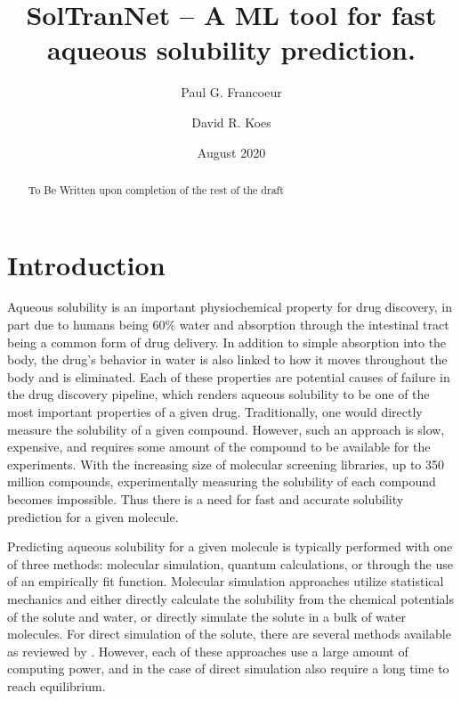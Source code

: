 \documentclass[journal=jmcmar,manuscript=article]{achemso}
\title{SolTranNet -- A ML tool for fast aqueous solubility prediction.}
\author{Paul G. Francoeur}
\author{David R. Koes}
\affiliation[Pitt]{Department of Computational and Systems Biology, University of Pittsburgh, Pittsburgh, PA 15260}
\date{August 2020}
\begin{document}
\begin{abstract}
To Be Written upon completion of the rest of the draft

\end{abstract}


\section{Introduction}
Aqueous solubility is an important physiochemical property for drug discovery, in part due to humans being 60\% water\cite{HumanWater} and absorption through the intestinal tract being a common form of drug delivery. 
In addition to simple absorption into the body, the drug's behavior in water is also linked to how it moves throughout the body and is eliminated. Each of these properties are potential causes of failure in the drug discovery pipeline, which renders aqueous solubility to be one of the most important properties of a given drug.\cite{LIPINSKI1997,DI2006446,EKINS2002305}
Traditionally, one would directly measure the solubility of a given compound.
However, such an approach is slow, expensive, and requires some amount of the compound to be available for the experiments.
With the increasing size of molecular screening libraries, up to 350 million compounds,\cite{NatureVS} experimentally measuring the solubility of each compound becomes impossible.
Thus there is a need for fast and accurate solubility prediction for a given molecule.

Predicting aqueous solubility for a given molecule is typically performed with one of three methods: molecular simulation, quantum calculations, or through the use of an empirically fit function.
Molecular simulation approaches utilize statistical mechanics and either directly calculate the solubility from the chemical potentials of the solute and water\cite{denseStates}, or directly simulate the solute in a bulk of water molecules.
For direct simulation of the solute, there are several methods available as reviewed by \citet{solrev1}.
However, each of these approaches use a large amount of computing power, and in the case of direct simulation also require a long time to reach equilibrium.
\end{document}
